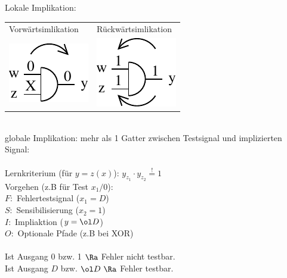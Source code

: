 \documentclass[6pt,a4paper]{scrartcl}
\begin{document}
\begin{multicols}{3}
	Lokale Implikation:
	\begin{tabular}{ll}
	Vorwärtsimlikation & Rückwärtsimlikation\\
	\includegraphics[scale = 0.8]{./img/ds/vorimplikation.pdf} & \includegraphics[scale = 0.7]{./img/ds/backimplication.pdf}\\%
	\end{tabular}
	\\
	globale Implikation: mehr als 1 Gatter zwischen Testsignal und implizierten Signal:\\
	\\
	Lernkriterium (für $y=z(x)$): $y_{z_1} \cdot y_{z_2} \stackrel{!}= 1$\\

	Vorgehen (z.B für Test $x_1/0$):\\
	$F:$ Fehlertestsignal ($x_1 = D$)\\
	$S:$ Sensibilisierung ($x_2 = 1$)\\
	$I:$ Impliaktion ($y = \ol D$)\\
	$O:$ Optionale Pfade (z.B bei XOR)\\
	\\
	Ist Ausgang $0$ bzw. 1 $\Ra$ Fehler nicht testbar.\\
	Ist Ausgang $D$ bzw. $\ol D\ \Ra$ Fehler testbar.\\


\end{multicols}
\end{document}
